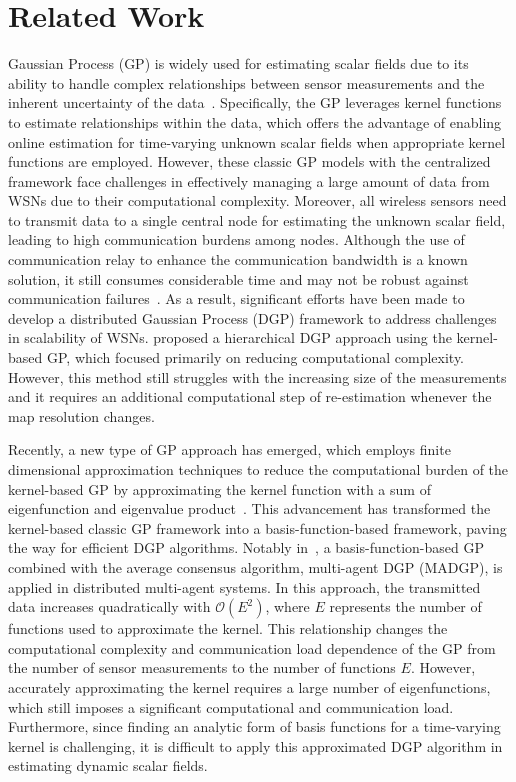\section{Related Work}
Gaussian Process (GP) is widely used for estimating scalar fields due to its ability to handle complex relationships between sensor measurements and the inherent uncertainty of the data~\citep{wang2017online, guerrero2021sparse}. Specifically, the GP leverages kernel functions to estimate relationships within the data, which offers the advantage of enabling online estimation for time-varying unknown scalar fields when appropriate kernel functions are employed. However, these classic GP models with the centralized framework face challenges in effectively managing a large amount of data from WSNs due to their computational complexity. Moreover, all wireless sensors need to transmit data to a single central node for estimating the unknown scalar field, leading to high communication burdens among nodes. Although the use of communication relay to enhance the communication bandwidth is a known solution, it still consumes considerable time and may not be robust against communication failures~\citep{manfredi2013design}. As a result, significant efforts have been made to develop a distributed Gaussian Process (DGP) framework to address challenges in scalability of WSNs.
\cite{deisenroth2015distributed} proposed a hierarchical DGP approach using the kernel-based GP, which focused primarily on reducing computational complexity. However, this method still struggles with the increasing size of the measurements and it requires an additional computational step of re-estimation whenever the map resolution changes.

Recently, a new type of GP approach has emerged, which employs finite dimensional approximation techniques to reduce the computational burden of the kernel-based GP by approximating the kernel function with a sum of eigenfunction and eigenvalue product~\citep{8387507, solin2014hilbert}. This advancement has transformed the kernel-based classic GP framework into a basis-function-based framework, paving the way for efficient DGP algorithms. Notably in~\citep{9144385}, a basis-function-based GP combined with the average consensus algorithm, multi-agent DGP (MADGP), is applied in distributed multi-agent systems. In this approach, the transmitted data increases quadratically with $\mathcal{O}(E^2)$, where $E$ represents the number of functions used to approximate the kernel. This relationship changes the computational complexity and communication load dependence of the GP from the number of sensor measurements to the number of functions $E$. However, accurately approximating the kernel requires a large number of eigenfunctions, which still imposes a significant computational and communication load. Furthermore, since finding an analytic form of basis functions for a time-varying kernel is challenging, it is difficult to apply this approximated DGP algorithm in estimating dynamic scalar fields.

